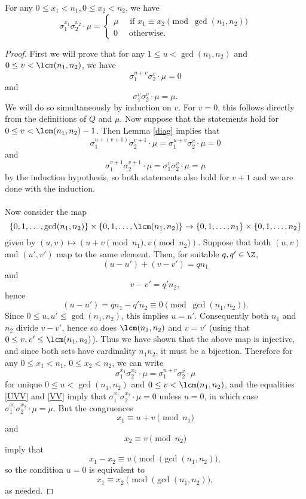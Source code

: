 \begin{lemma}\label{M0}
For any $0\leq x_1<n_1, 0\leq x_2<n_2$, we have $$\sigma_1^{x_1}\sigma_2^{x_2}\cdot \mu=\begin{cases}
\mu \quad \text{ if } x_1\equiv x_2 \pmod{\gcd(n_1,n_2)}\\
0 \quad \text{ otherwise}.
\end{cases}$$
\end{lemma}
\begin{proof}
First we will prove that for any $1\leq u<\gcd(n_1,n_2)$ and $0\leq v<\lcm(n_1,n_2)$, we have 
\begin{equation}\label{UVV}
\sigma_1^{u+v}\sigma_2^{v}\cdot \mu=0
\end{equation}
and
\begin{equation}\label{VV}
\sigma_1^{v}\sigma_2^{v}\cdot \mu=\mu.
\end{equation}
We will do so simultaneously by induction on $v$. For $v=0$, this follows directly from the definitions of $Q$ and $\mu$. Now suppose that the statements hold for $0\leq v<\lcm(n_1,n_2)-1$. Then Lemma \ref{diag} implies that $$\sigma_1^{u+(v+1)}\sigma_2^{v+1}\cdot \mu=\sigma_1^{u+v}\sigma_2^{v}\cdot \mu=0$$
and $$\sigma_1^{v+1}\sigma_2^{v+1}\cdot \mu=\sigma_1^{v}\sigma_2^{v}\cdot \mu=\mu$$
by the induction hypothesis, so both statements also hold for $v+1$ and we are done with the induction.

\paragraph*{}
Now consider the map $$\{0,1,\dots,\gcd(n_1,n_2)\}\times \{0,1,\dots,\lcm(n_1,n_2)\} \to \{0,1,\dots,n_1\}\times \{0,1,\dots,n_2\}$$
given by $(u,v)\mapsto (u+v\pmod{n_1},v \pmod{n_2})$. Suppose that both $(u,v)$ and $(u',v')$ map to the same element. Then, for suitable $q, q' \in \Z$, $$(u-u')+(v-v')=qn_1$$ and $$v-v'=q'n_2,$$ hence $$(u-u')=qn_1-q'n_2\equiv 0 \pmod {\gcd(n_1,n_2)}.$$ Since $0\le u,u'\le \gcd(n_1,n_2)$, this implies $u=u'$. Consequently both $n_1$ and $n_2$ divide $v-v'$, hence so does $\lcm(n_1,n_2)$ and $v=v'$ (using that $0\le v,v'\le \lcm(n_1,n_2)$). Thus we have shown that the above map is injective, and since both sets have cardinality $n_1n_2$, it must be a bijection. Therefore for any $0\leq x_1<n_1$, $0\leq x_2<n_2$, we can write $$\sigma_1^{x_1}\sigma_2^{x_2}\cdot \mu=\sigma_1^{u+v}\sigma_2^{v}\cdot \mu$$
for unique $0\leq u<\gcd(n_1,n_2)$ and $0\leq v<\lcm(n_1,n_2)$, and the equalities \eqref{UVV} and \eqref{VV} imply that $\sigma_1^{x_1}\sigma_2^{x_2}\cdot \mu=0$ unless $u=0$, in which case $\sigma_1^{x_1}\sigma_2^{x_2}\cdot \mu=\mu$. But the congruences $$x_1\equiv u+v \pmod{n_1}$$ and $$x_2\equiv v \pmod{n_2}$$ imply that $$x_1-x_2\equiv u  \pmod{(\gcd(n_1,n_2)},$$
so the condition $u=0$ is equivalent to $$x_1\equiv x_2 \pmod{(\gcd(n_1,n_2)},$$ as needed.


\end{proof}
